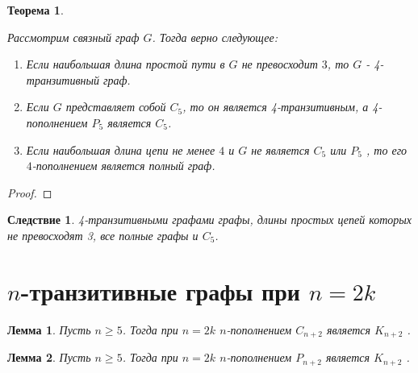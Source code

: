 \documentclass[a4paper,12pt]{article}
\theoremstyle{plain}
\newtheorem{theorem}{Теорема}
\newtheorem{lemma}{Лемма}
\newtheorem*{corollary*}{Следствие}
\theoremstyle{definition}
\begin{document}
	
	\begin{theorem}\label{t2}
		{\it Рассмотрим связный граф $G$. Тогда верно следующее:
\begin{enumerate}
\item[1)] Если наибольшая длина простой пути в $G$ не превосходит $3$, то $G$ - 4-транзитивный граф.
\item[2)] Если $G$ представляет собой $C_{5}$, то он является 4-транзитивным, а 4-пополнением $P_{5}$ является $C_{5}$.
\item[3)] Если  наибольшая длина цепи не менее $4$ и $G$ не является  $C_{5}$ или $P_{5}$ , то его $4$-пополнением является полный граф.

\end{enumerate}}
	\end{theorem}
	\begin{proof}
		
		
	


	
		\end{proof}
\begin{corollary*}
		{\it 4-транзитивными графами графы, длины простых цепей которых не превосходят 3, все полные графы и $C_{5}$.}
	\end{corollary*}
	
	\begin{figure}[!b]
	\centering
	
	\caption{}
	\label{gesture}
\end{figure}
	
	
		
	\section{$n$-транзитивные графы при $n=2k$}
	
	
	
	\begin{lemma} \label{l11}
		{\it Пусть $n \geq 5 $. Тогда при $n=2k$ $n$-пополнением $C_{n+2}$ является $K_{n+2}$   .}
	\end{lemma}
	
	
	\begin{lemma} \label{l12}
		{\it Пусть $n \geq 5 $. Тогда при $n=2k$ $n$-пополнением $P_{n+2}$ является $K_{n+2}$   .}
	\end{lemma}
	
\end{document}

